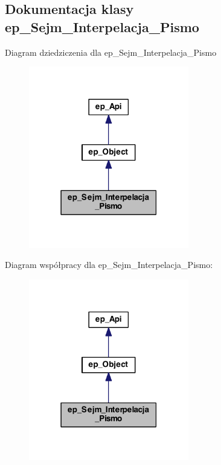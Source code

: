 \hypertarget{classep___sejm___interpelacja___pismo}{\subsection{Dokumentacja klasy ep\-\_\-\-Sejm\-\_\-\-Interpelacja\-\_\-\-Pismo}
\label{classep___sejm___interpelacja___pismo}
}


Diagram dziedziczenia dla ep\-\_\-\-Sejm\-\_\-\-Interpelacja\-\_\-\-Pismo\nopagebreak
\begin{figure}[H]
\begin{center}
\leavevmode
\includegraphics[width=198pt]{classep___sejm___interpelacja___pismo__inherit__graph}
\end{center}
\end{figure}


Diagram współpracy dla ep\-\_\-\-Sejm\-\_\-\-Interpelacja\-\_\-\-Pismo\-:\nopagebreak
\begin{figure}[H]
\begin{center}
\leavevmode
\includegraphics[width=198pt]{classep___sejm___interpelacja___pismo__coll__graph}
\end{center}
\end{figure}
